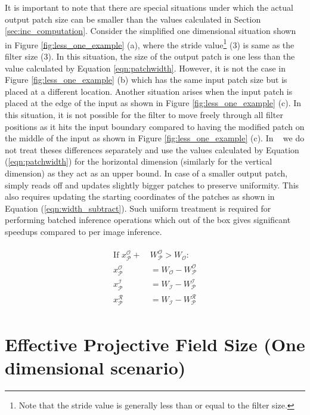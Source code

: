 It is important to note that there are special situations under which the actual output patch size can be smaller than the values calculated in Section \ref{sec:inc_computation}. Consider the simplified one dimensional situation shown in Figure \ref{fig:less_one_example} (a), where the stride value\footnote{Note that the stride value is generally less than or equal to the filter size.} (3) is same as the filter size (3). In this situation, the size of the output patch is one less than the value calculated by Equation \ref{eqn:patchwidth}. However, it is not the case in Figure \ref{fig:less_one_example} (b) which has the same input patch size but is placed at a different location.
Another situation arises when the input patch is placed at the edge of the input as shown in Figure \ref{fig:less_one_example} (c). In this situation, it is not possible for the filter to move freely through all filter positions as it hits the input boundary compared to having the modified patch on the middle of the input as shown in Figure \ref{fig:less_one_example} (c).
In \system~ we do not treat theses differences separately and use the values calculated by Equation (\ref{eqn:patchwidth}) for the horizontal dimension (similarly for the vertical dimension) as they act as an upper bound. In case of a smaller output patch, \system~ simply reads off and updates slightly bigger patches to preserve uniformity.
This also requires updating the starting coordinates of the patches as shown in Equation (\ref{eqn:width_subtract}).
Such uniform treatment is required for performing batched inference operations which out of the box gives significant speedups compared to per image inference.


\begin{align}
\begin{split}
\label{eqn:width_subtract}
\text{If~} x^\mathcal{O}_\mathcal{P} + &~W^\mathcal{O}_\mathcal{P} > W_{\mathcal{O}}:\\
x^\mathcal{O}_\mathcal{P} &~ =  W_{\mathcal{O}} - W^\mathcal{O}_\mathcal{P}\\
x^\mathcal{I}_\mathcal{P} &~ = W_{\mathcal{I}} - W^\mathcal{I}_\mathcal{P}\\
x^\mathcal{R}_\mathcal{P} &~ = W_{\mathcal{I}} - W^\mathcal{R}_\mathcal{P}
\end{split}
\end{align}


\section{Effective Projective Field Size (One dimensional scenario)}

